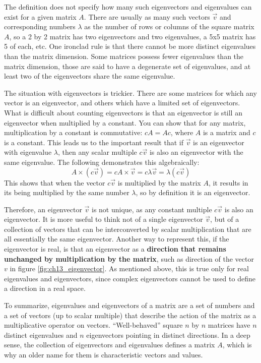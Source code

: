 \documentclass[
]{book}
\theoremstyle{definition}
\theoremstyle{definition}
\theoremstyle{definition}
\theoremstyle{remark}
\begin{document}
The definition does not specify how many such eigenvectors and eigenvalues can exist for a given matrix \(A\). There are usually as many such vectors \(\vec v\) and corresponding numbers \(\lambda\) as the number of rows or columns of the square matrix \(A\), so a 2 by 2 matrix has two eigenvectors and two eigenvalues, a 5x5 matrix has 5 of each, etc. One ironclad rule is that there cannot be more distinct eigenvalues than the matrix dimension. Some matrices possess fewer eigenvalues than the matrix dimension, those are said to have a degenerate set of eigenvalues, and at least two of the eigenvectors share the same eigenvalue.

The situation with eigenvectors is trickier. There are some matrices for which any vector is an eigenvector, and others which have a limited set of eigenvectors. What is difficult about counting eigenvectors is that an eigenvector is still an eigenvector when multiplied by a constant. You can show that for any matrix, multiplication by a constant is commutative: \(cA = Ac\), where \(A\) is a matrix and \(c\) is a constant. This leads us to the important result that if \(\vec v\) is an eigenvector with eigenvalue \(\lambda\), then any scalar multiple \(c \vec v\) is also an eigenvector with the same eigenvalue. The following demonstrates this algebraically:
\[ A  \times  (c \vec v) = c A  \times  \vec v = c \lambda \vec v =  \lambda (c \vec v) \]
This shows that when the vector \(c \vec v\) is multiplied by the matrix \(A\), it results in its being multiplied by the same number \(\lambda\), so by definition it is an eigenvector.

Therefore, an eigenvector \(\vec v\) is not unique, as any constant multiple \(c \vec v\) is also an eigenvector. It is more useful to think not of a single eigenvector \(\vec v\), but of a collection of vectors that can be interconverted by scalar multiplication that are all essentially the same eigenvector. Another way to represent this, if the eigenvector is real, is that an eigenvector as a \textbf{direction that remains unchanged by multiplication by the matrix}, such as direction of the vector \(v\) in figure \ref{fig:ch13_eigenvector}. As mentioned above, this is true only for real eigenvalues and eigenvectors, since complex eigenvectors cannot be used to define a direction in a real space.

To summarize, eigenvalues and eigenvectors of a matrix are a set of numbers and a set of vectors (up to scalar multiple) that describe the action of the matrix as a multiplicative operator on vectors. ``Well-behaved'' square \(n\) by \(n\) matrices have \(n\) distinct eigenvalues and \(n\) eigenvectors pointing in distinct directions. In a deep sense, the collection of eigenvectors and eigenvalues defines a matrix \(A\), which is why an older name for them is characteristic vectors and values.
\end{document}
